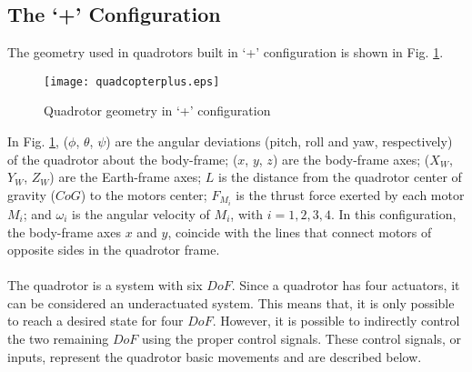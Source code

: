 \subsection{The `+' Configuration}
The geometry used in quadrotors built in `+' configuration is shown in Fig. \ref{fig:quadcopterplus}.
\\
\begin{figure}[H]
\begin{center}
  \texttt{[image: quadcopterplus.eps]}
\caption{Quadrotor geometry in `+' configuration} 
    \label{fig:quadcopterplus}
    \end{center}
\end{figure}
In Fig. \ref{fig:quadcopterplus}, ($\phi$, $\theta$, $\psi$) are the angular deviations (pitch, roll and yaw, respectively) of the quadrotor about the body-frame;
 ($x$, $y$, $z$) are the body-frame axes;  ($X_W$, $Y_W$, $Z_W$) are the Earth-frame axes; $L$ is the distance from the quadrotor center of gravity ($CoG$) to the motors center; $F_{M_i}$ is the thrust force exerted by each motor $M_i$; and $\omega_i$ is the angular velocity of $M_i$, with $i = 1,2,3,4$. In this configuration, the body-frame axes $x$ and $y$, coincide with the lines that connect motors of opposite sides in the quadrotor frame.
\\\\
The quadrotor is a system with six $DoF$. Since a quadrotor has four actuators, it can be considered an underactuated system. This means that, it is only possible to reach a desired state for four $DoF$. However, it is possible to indirectly control the two remaining $DoF$ using the proper control signals. These control signals, or inputs, represent the quadrotor basic movements and are described below.

